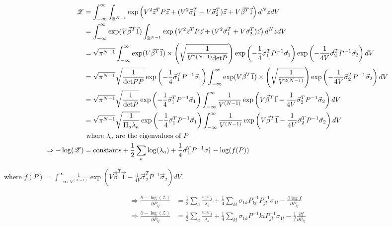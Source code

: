 \documentclass{article}
\newcommand{\z}{\mathscr{Z}}
\begin{document}
\begin{align*}
\z&=\int_{-\infty}^\infty\int_{\R^{N-1}}\exp\left(V^2\vec{z}^TP\vec{z}+(V^2\vec{\sigma}_1^T+V\vec{\sigma}_2^T)\vec{z}+V\vec{\beta}^T\vec{1}\right)d^NzdV
\\&=\int_{-\infty}^\infty \exp(V\vec{\beta}^T\vec{1})\int_{\R^{N-1}}\exp\left(V^2\vec{z}^TP\vec{z}+(V^2\vec{\sigma}_1^T+V\vec{\sigma}_2^T)\vec{z}\right)d^NzdV
\\&=\sqrt{\pi^{N-1}}\int_{-\infty}^\infty\exp(V\vec{\beta}^T\vec{1})\times\left(\sqrt{\frac{1}{V^{2(N-1)}\det{P}}}\right)\exp\left(-\frac{1}{4}\vec{\sigma}_1^TP^{-1}\vec{\sigma}_1\right)\exp\left(-\frac{1}{4V}\vec{\sigma}_2^TP^{-1}\vec{\sigma}_2\right)dV
\\&=\sqrt{\pi^{N-1}}\sqrt{\frac{1}{\det PP}}\exp\left(-\frac{1}{4}\vec{\sigma}_1^TP^{-1}\vec{\sigma}_1\right)\int_{-\infty}^\infty\exp(V\vec{\beta}^T\vec{1})\times\left(\sqrt{\frac{1}{V^{2(N-1)}}}\right)\exp\left(-\frac{1}{4V}\vec{\sigma}_2^TP^{-1}\vec{\sigma}_2\right)dV
\\&=\sqrt{\pi^{N-1}}\sqrt{\frac{1}{\det P}}\exp\left(-\frac{1}{4}\vec{\sigma}_1^TP^{-1}\vec{\sigma}_1\right)\int_{-\infty}^\infty\frac{1}{V^{(N-1)}}\exp\left(V\vec{\beta}^T\vec{1}-\frac{1}{4V}\vec{\sigma}_2^TP^{-1}\vec{\sigma}_2\right)dV
\\&=\sqrt{\pi^{N-1}}\sqrt{\frac{1}{\Pi_a\lambda_a}}\exp\left(-\frac{1}{4}\vec{\sigma}_1^TP^{-1}\vec{\sigma}_1\right)\int_{-\infty}^\infty\frac{1}{V^{(N-1)}}\exp\left(V\vec{\beta}^T\vec{1}-\frac{1}{4V}\vec{\sigma}_2^TP^{-1}\vec{\sigma}_2\right)dV 
\\&\text{ where $\lambda_a$ are the eigenvalues of $P$}
\\ \Rightarrow -\log(\z)&=\text{constants}+\frac{1}{2}\sum_a\log(\lambda_a)+\frac{1}{4}\vec{\sigma}_1^TP^{-1}\vec{\sigma_1}-\log(f(P))
\end{align*}

where $f(P)=\int_{-\infty}^\infty\frac{1}{V^{(N-1)}}\exp\left(V\vec{\beta}^T\vec{1}-\frac{1}{4V}\vec{\sigma}_2^TP^{-1}\vec{\sigma}_2\right)dV $.

\begin{align*}
\Rightarrow\frac{\partial -\log(\z)}{\partial P_{ij}}&=\frac{1}{2}\sum_a\frac{w_iw_j}{\lambda_a}+\frac{1}{4}\sum_{kl}\sigma_{1k}P^{-1}_{ki}P^{-1}_{jl}\sigma_{1l}-\frac{\partial \log f}{\partial P_{ij}}
\\\Rightarrow\frac{\partial -\log(\z)}{\partial P_{ij}}&=\frac{1}{2}\sum_a\frac{w_iw_j}{\lambda_a}+\frac{1}{4}\sum_{kl}\sigma_{1k}P^{-1}{ki}P^{-1}_{jl}\sigma_{1l}-\frac{1}{f}\frac{\partial f}{\partial P_{ij}}
\end{align*}
\end{document}

